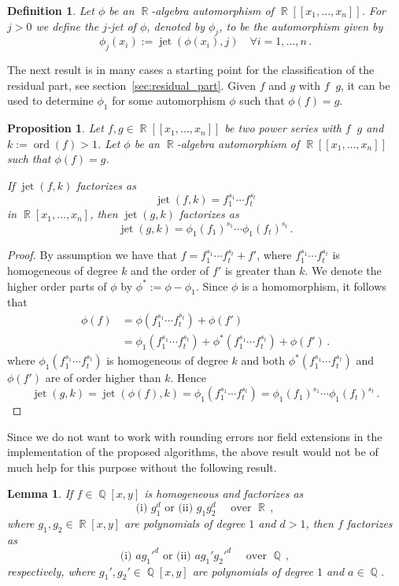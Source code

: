 \documentclass[noend]{amsproc}
\newtheorem{defn}[theorem]{Definition}
\newtheorem{prop}[theorem]{Proposition}
\newtheorem{lemma}[theorem]{Lemma}
\DeclareMathOperator{\ord}{ord}
\DeclareMathOperator{\requiv}{\overset{r}{\sim}}
\DeclareMathOperator{\jet}{jet}
\DeclareMathOperator{\Q}{\mathbb{Q}}
\DeclareMathOperator{\R}{\mathbb{R}}
\begin{document}
\begin{defn}
Let $\phi$ be an $\R$-algebra automorphism of $\R[[x_1,\ldots,x_n]]$.
For $j > 0$ we define the
\emph{$j$-jet} of $\phi$, denoted by $\phi_j$, to be the automorphism given by
\[
\phi_j(x_i) := \jet(\phi(x_i),j) \quad \forall i = 1,\ldots,n \,.
\]
\end{defn}

The next result is in many cases a starting point for the classification of the
residual part, see section~\ref{sec:residual_part}. Given $f$ and $g$ with $f
\requiv g$, it can be used to determine $\phi_1$ for some automorphism $\phi$
such that $\phi(f) = g$.

\begin{prop}\label{kjet}
Let $f,g \in \R[[x_1,\ldots,x_n]]$ be two power series with $f \requiv g$ and
$k := \ord(f) > 1$. Let $\phi$ be an $\R$-algebra automorphism of
$\R[[x_1,\ldots,x_n]]$ such that $\phi(f)=g$.

If $\jet(f,k)$ factorizes as
\[
\jet(f,k) = f_1^{s_1} \cdots f_t^{s_t}
\]
in $\R[x_1,\ldots,x_n]$, then $\jet(g,k)$ factorizes as
\[
\jet(g,k) = \phi_1(f_1)^{s_1} \cdots \phi_1(f_t)^{s_t} \,.
\]
\end{prop}

\begin{proof}
By assumption we have that $f = f_1^{s_1} \cdots f_t^{s_t} + f'$, where
$f_1^{s_1} \cdots f_t^{s_t}$ is homogeneous of degree $k$ and the order of $f'$
is greater than $k$. We denote the higher order parts of $\phi$ by
$\phi^* := \phi-\phi_1$. Since $\phi$ is a homomorphism, it follows that
\begin{align*}
\phi(f) &= \phi(f_1^{s_1} \cdots f_t^{s_t}) + \phi(f') \\
&= \phi_1(f_1^{s_1} \cdots f_t^{s_t})
+ \phi^*(f_1^{s_1} \cdots f_t^{s_t}) + \phi(f') \,.
\end{align*}
where $\phi_1(f_1^{s_1} \cdots f_t^{s_t})$ is homogeneous of degree $k$ and
both $\phi^*(f_1^{s_1} \cdots f_t^{s_t})$ and $\phi(f')$ are of order higher
than $k$. Hence
\[
\jet(g, k) = \jet(\phi(f), k) = \phi_1(f_1^{s_1} \cdots f_t^{s_t})
= \phi_1(f_1)^{s_1} \cdots \phi_1(f_t)^{s_t} \,.
\]
\end{proof}

Since we do not want to work with rounding errors nor field extensions in the
implementation of the proposed algorithms, the above result would not be of
much help for this purpose without the following result.

\begin{lemma}\label{x^3}
If $f \in \Q[x,y]$ is homogeneous and factorizes as
\[
\text{(i) } g_1^d \text{ or (ii) } g_1 g_2^d \quad \text{ over } \R \,,
\]
where $g_1, g_2 \in \R[x,y]$ are polynomials of degree $1$ and $d > 1$, then
$f$ factorizes as
\[
\text{(i) } ag_1'^d \text{ or (ii) } ag_1' g_2'^d
\quad \text{ over } \Q \,,
\]
respectively, where $g_1', g_2' \in \Q[x,y]$ are polynomials of degree $1$ and
$a \in \Q$.
\end{lemma}
\end{document}
